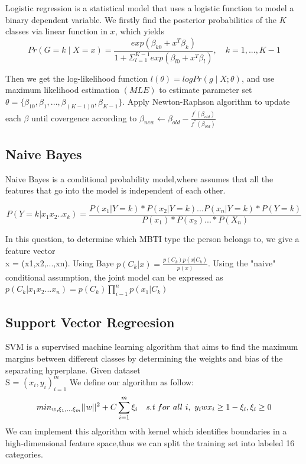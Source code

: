 \documentclass{article}
\begin{document}
Logistic regression is a statistical model that uses a logistic function to model a binary dependent variable. We firstly find the posterior probabilities of the $K$ classes via linear function in $x$, which yields $$Pr\left(G = k\mid X = x\right) = \frac{exp\left(\beta_{k0}+x^{T} \beta_{k}\right)}{1+\Sigma_{l=1}^{K-1}exp\left(\beta_{l0}+x^{T} \beta_{l}\right)},\quad k = 1,...,K-1$$ 

Then we get the log-likelihood function $l(\theta) = logPr\left(g\mid X; \theta\right) $, and use maximum likelihood estimation $\left(MLE\right)$ to estimate parameter set $\theta = \{\beta_{10},\beta_1,...,\beta_{\left(K-1\right)0},\beta_{K-1} \}$. Apply Newton-Raphson algorithm to update each $\beta$ until covergence according to $\beta_{new} \leftarrow \beta_{old} - \frac{f^{'}\left(\beta_{old}\right)}{f^{''}\left(\beta_{old}\right)}$


\subsection{Naive Bayes}
Naive Bayes is a conditional probability model,where  assumes that all the features that go into the model is independent of each other.

$$ P(Y= k|x_1x_2..x_k)= \frac{P(x_1|Y=k)*P(x_2|Y=k)...P(x_n|Y=k)*P(Y = k) }{ P(x_1)*P(x_2)...* P(X_n)}$$

In this question, to determine which MBTI type the person belongs to, we give a feature vector\\ x = (x1,x2,...,xn). Using Baye $ p(C_k|x) = \frac{p(C_k)p(x|C_k)}{p(x)} $. Using the "naive" conditional assumption, the joint model can be expressed as $p(C_k|x_1x_2...x_n) = p(C_k)\prod_{i-1}^n p(x_1|C_k)$ 

\subsection{Support Vector Regreesion}

SVM is a supervised machine learning algorithm that aims to find the maximum margins between different classes by determining the weights and bias of the separating hyperplane. Given dataset \\S = ${(x_i,y_i)}_{i=1}^m $ We define our algorithm as follow:
$$ min_{w,\xi_1,...\xi_m}||w||^2 + C\sum_{i=1}^m \xi_i \quad \emph{s.t} \ for \ all \ i, \ y_i w x_i \ge 1 - \xi_i, \xi_i \ge 0 $$
We can implement this algorithm with kernel which identifies boundaries in a high-dimensional feature space,thus  we can split the training set into labeled 16 categories.
\end{document}
